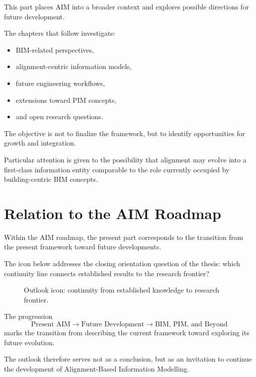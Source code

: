 This part places AIM into a broader context and explores possible
directions for future development.

The chapters that follow investigate:
\begin{itemize}
\item BIM-related perspectives,
\item alignment-centric information models,
\item future engineering workflows,
\item extensions toward PIM concepts,
\item and open research questions.
\end{itemize}

The objective is not to finalize the framework, but to identify
opportunities for growth and integration.

Particular attention is given to the possibility that alignment may
evolve into a first-class information entity comparable to the role
currently occupied by building-centric BIM concepts.

\section*{Relation to the AIM Roadmap}

Within the AIM roadmap, the present part corresponds to the transition
from the present framework toward future developments.

The icon below addresses the closing orientation question of the thesis:
which continuity line connects established results to the research
frontier?

\begin{figure}[ht]
\centering

\caption{Outlook icon: continuity from established knowledge to research frontier.}
\label{fig:icon-outlook-established-frontier}
\end{figure}

The progression
\[
\text{Present AIM}
\rightarrow
\text{Future Development}
\rightarrow
\text{BIM, PIM, and Beyond}
\]
marks the transition from describing the current framework toward
exploring its future evolution.

The outlook therefore serves not as a conclusion, but as an invitation
to continue the development of Alignment-Based Information Modelling.

